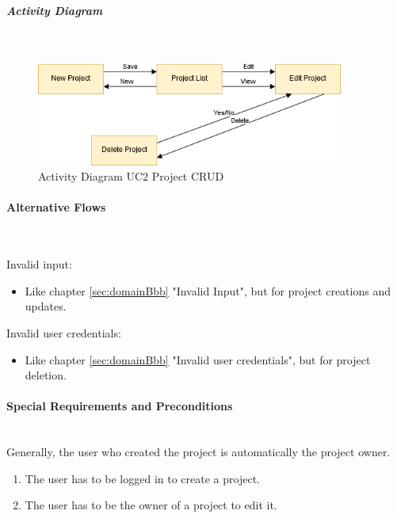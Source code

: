 
\newpage
\subparagraph{Activity Diagram}\mbox{}\\
\begin{figure}[h]
	\centering
	\includegraphics[width=0.9\textwidth]{Content/Domain/UC2ProjectCRUDactivitydiagram.png}
	\caption{Activity Diagram \ac{UC}2 Project CRUD}
	\label{fig:activityDiagramUC2}
\end{figure}

\paragraph*{Alternative Flows}\mbox{}\\

\noindent
Invalid input: 
\begin{itemize}
	\vspace{-3mm}
	\setlength\itemsep{-1em}
	\item Like chapter \ref{sec:domainBbb} "Invalid Input", but for project creations and updates.
\end{itemize}

\noindent
Invalid user credentials:
\begin{itemize}
	\vspace{-3mm}
	\setlength\itemsep{-1em}
	\item Like chapter \ref{sec:domainBbb} "Invalid user credentials", but for project deletion.
\end{itemize}

\paragraph*{Special Requirements and Preconditions}\mbox{}\\
Generally, the user who created the project is automatically the project owner.
\begin{enumerate}
	\vspace{-3mm}
	\setlength\itemsep{-1em}
	\item The user has to be logged in to create a project. 
	\item The user has to be the owner of a project to edit it.
\end{enumerate}

